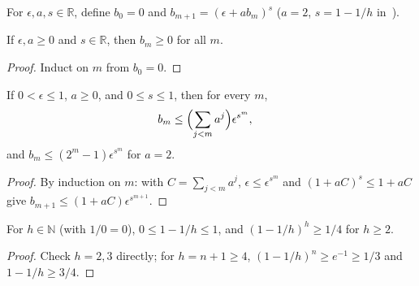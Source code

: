 \begin{definition}
    \label{def:hastings05_level_deficiency}
    \leanok
    For $\epsilon,a,s\in\mathbb R$, define $b_0=0$ and
    $b_{m+1}=(\epsilon+ab_m)^s$ ($a=2$, $s=1-1/h$
    in~\cite[lines 696--704]{Hastings2006Solving}).
\end{definition}

\begin{lemma}
    \label{thm:hastings05_level_deficiency_nonneg}
    \leanok
    If $\epsilon,a\ge0$ and $s\in\mathbb R$, then $b_m\ge0$ for all $m$.
\end{lemma}
\begin{proof}\leanok
    Induct on $m$ from $b_0=0$.
\end{proof}

\begin{lemma}
    \label{thm:hastings05_recursion}
    \leanok
    If $0<\epsilon\le1$, $a\ge0$, and $0\le s\le1$, then for every $m$,
    \begin{align}
        b_m & \le\Bigl(\sum_{j<m}a^j\Bigr)\epsilon^{s^m},
        \label{eq:hastings05_recursion}
    \end{align}
    and $b_m\le(2^m-1)\epsilon^{s^m}$ for $a=2$.
\end{lemma}
\begin{proof}\leanok
    By induction on $m$: with $C=\sum_{j<m}a^j$, $\epsilon\le\epsilon^{s^m}$ and
    $(1+aC)^s\le1+aC$ give $b_{m+1}\le(1+aC)\epsilon^{s^{m+1}}$.
\end{proof}

\begin{lemma}
    \label{thm:hastings05_exponent}
    \leanok
    For $h\in\mathbb N$ (with $1/0=0$), $0\le1-1/h\le1$, and $(1-1/h)^h\ge1/4$
    for $h\ge2$.
\end{lemma}
\begin{proof}\leanok
    Check $h=2,3$ directly; for $h=n+1\ge4$,
    $(1-1/h)^n\ge e^{-1}\ge1/3$ and $1-1/h\ge3/4$.
\end{proof}

